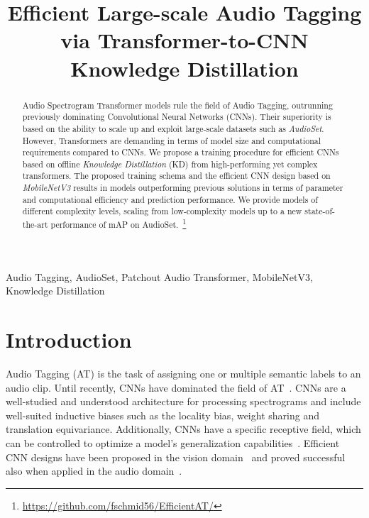 \documentclass{article}
\title{Efficient Large-scale Audio Tagging via Transformer-to-CNN
Knowledge Distillation}
\begin{document}
\maketitle






\begin{abstract}
Audio Spectrogram Transformer models rule the field of Audio Tagging, outrunning previously dominating Convolutional Neural Networks (CNNs). Their superiority is based on the ability to scale up and exploit large-scale datasets such as \textit{AudioSet}. However, Transformers are demanding in terms of model size and computational requirements compared to CNNs. 
We propose a training procedure for efficient CNNs based on offline \textit{Knowledge Distillation} (KD) from high-performing yet complex transformers. The proposed training schema and the efficient CNN design based on \textit{MobileNetV3} results in models outperforming previous solutions in terms of parameter and computational efficiency and prediction performance. We provide models of different complexity levels, scaling from low-complexity models up to a new state-of-the-art performance of  mAP on AudioSet.~\footnote{\url{https://github.com/fschmid56/EfficientAT/}}
\end{abstract}
\begin{keywords}
Audio Tagging, AudioSet, Patchout Audio Transformer, MobileNetV3, Knowledge Distillation
\end{keywords}
\vspace{-6pt}
\section{Introduction}
\label{sec:introduction}

Audio Tagging (AT) is the task of assigning one or multiple semantic labels to an audio clip. Until recently, CNNs have dominated the field of AT~\cite{Kong20PANNs, Gong21PSLA, Verbitskiy21ERANN}. CNNs are a well-studied and understood architecture for processing spectrograms and include well-suited inductive biases such as the locality bias, weight sharing and translation equivariance. Additionally, CNNs have a specific receptive field, which can be controlled to optimize a model's generalization capabilities~\cite{Koutini21Receptive}. Efficient CNN designs have been proposed in the vision domain~\cite{Howard17MobileNets, Sandler18MobileNetsV2, Howard19MobileNetV3, Tan19EfficientNet, Tan21EfficientNetV2} and proved successful also when applied in the audio domain~\cite{Gong21PSLA, Gong22CMKD}. 
\end{document}
